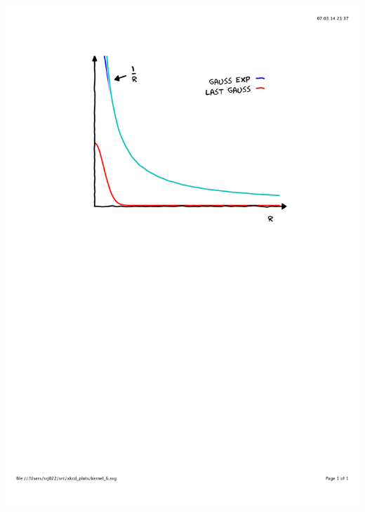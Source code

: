 \begin{frame}
\begin{columns}
\begin{column}{.50\textwidth}
{        \includegraphics[scale=0.4, clip, viewport = 110 450 490 800]
            {figures/kernel_6.pdf}}
\end{column}
\end{columns}
\end{frame}
